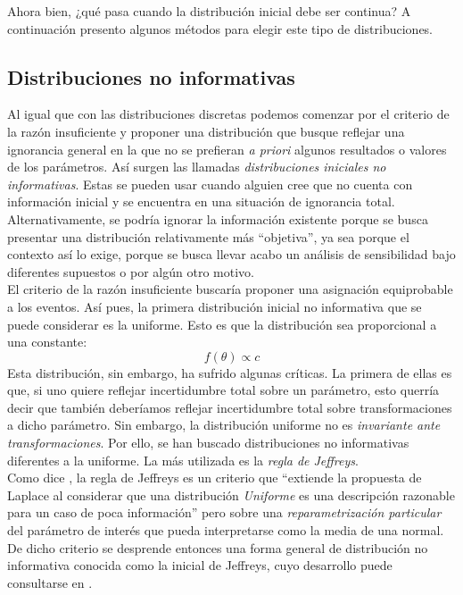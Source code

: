 Ahora bien, ¿qué pasa cuando la distribución inicial debe ser continua? A continuación presento algunos métodos para elegir este tipo de distribuciones.

\subsection{Distribuciones no informativas}

Al igual que con las distribuciones discretas podemos comenzar por el criterio de la razón insuficiente y proponer una distribución que busque reflejar una ignorancia general en la que no se prefieran \textit{a priori} algunos resultados o valores de los parámetros. Así surgen las llamadas \textit{distribuciones iniciales no informativas}. Estas se pueden usar cuando alguien cree que no cuenta con información inicial y se encuentra en una situación de ignorancia total. Alternativamente, se podría ignorar la información existente porque se busca presentar una distribución relativamente más ``objetiva'', ya sea porque el contexto así lo exige, porque se busca llevar acabo un análisis de sensibilidad bajo diferentes supuestos o por algún otro motivo.\\ 

El criterio de la razón insuficiente buscaría proponer una asignación equiprobable a los eventos. Así pues, la primera distribución inicial no informativa que se puede considerar es la uniforme. Esto es que la distribución sea proporcional a una constante:
\begin{equation*}
f(\theta) \propto c
\end{equation*}
Esta distribución, sin embargo, ha sufrido algunas críticas. La primera de ellas es que, si uno quiere reflejar incertidumbre total sobre un parámetro, esto querría decir que también deberíamos reflejar incertidumbre total sobre transformaciones a dicho parámetro. Sin embargo, la distribución uniforme no es \textit{invariante ante transformaciones}. Por ello, se han buscado distribuciones no informativas diferentes a la uniforme. La más utilizada es la \textit{regla de Jeffreys}.\\ 

Como dice \textcite{Regueiro12}, la regla de Jeffreys es un criterio que ``extiende la propuesta de Laplace al considerar que una distribución \textit{Uniforme} es una descripción razonable para un caso de poca información'' pero sobre una \textit{reparametrización particular} del parámetro de interés que pueda interpretarse como la media de una normal. De dicho criterio se desprende entonces una forma general de distribución no informativa conocida como la inicial de Jeffreys, cuyo desarrollo puede consultarse en \textcite{Mendoza11}.

